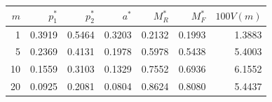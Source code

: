 \begin{tabular}{rrrrrrr}
\toprule
$m$ & $p_1^*$ & $p_2^*$ & $a^*$ & $M_R^*$ & $M_F^*$ & $100V(m)$ \\
\midrule
1 & 0.3919 & 0.5464 & 0.3203 & 0.2132 & 0.1993 & 1.3883 \\
5 & 0.2369 & 0.4131 & 0.1978 & 0.5978 & 0.5438 & 5.4003 \\
10 & 0.1559 & 0.3103 & 0.1329 & 0.7552 & 0.6936 & 6.1552 \\
20 & 0.0925 & 0.2081 & 0.0804 & 0.8624 & 0.8080 & 5.4437 \\
\bottomrule
\end{tabular}
